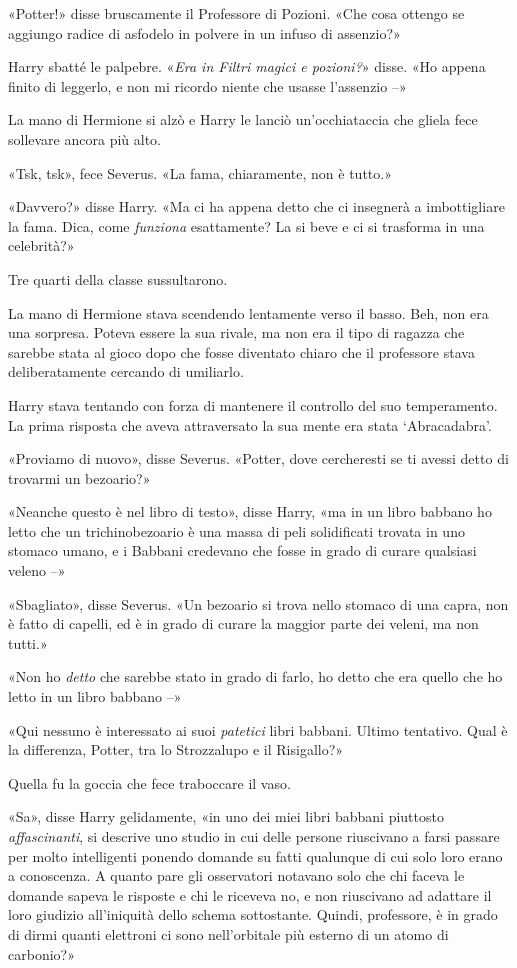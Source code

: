 «Potter!» disse bruscamente il Professore di Pozioni. «Che cosa ottengo se aggiungo radice di asfodelo in polvere in un infuso di assenzio?»

Harry sbatté le palpebre. «\textit{Era in Filtri magici e pozioni?}» disse. «Ho appena finito di leggerlo, e non mi ricordo niente che usasse l’assenzio –»

La mano di Hermione si alzò e Harry le lanciò un’occhiataccia che gliela fece sollevare ancora più alto.

«Tsk, tsk», fece Severus. «La fama, chiaramente, non è tutto.»

«Davvero?» disse Harry. «Ma ci ha appena detto che ci insegnerà a imbottigliare la fama. Dica, come \textit{funziona} esattamente? La si beve e ci si trasforma in una celebrità?»

Tre quarti della classe sussultarono.

La mano di Hermione stava scendendo lentamente verso il basso. Beh, non era una sorpresa. Poteva essere la sua rivale, ma non era il tipo di ragazza che sarebbe stata al gioco dopo che fosse diventato chiaro che il professore stava deliberatamente cercando di umiliarlo.

Harry stava tentando con forza di mantenere il controllo del suo temperamento. La prima risposta che aveva attraversato la sua mente era stata ‘Abracadabra’.

«Proviamo di nuovo», disse Severus. «Potter, dove cercheresti se ti avessi detto di trovarmi un bezoario?»

«Neanche questo è nel libro di testo», disse Harry, «ma in un libro babbano ho letto che un trichinobezoario è una massa di peli solidificati trovata in uno stomaco umano, e i Babbani credevano che fosse in grado di curare qualsiasi veleno –»

«Sbagliato», disse Severus. «Un bezoario si trova nello stomaco di una capra, non è fatto di capelli, ed è in grado di curare la maggior parte dei veleni, ma non tutti.»

«Non ho \textit{detto} che sarebbe stato in grado di farlo, ho detto che era quello che ho letto in un libro babbano –»

«Qui nessuno è interessato ai suoi \textit{patetici} libri babbani. Ultimo tentativo. Qual è la differenza, Potter, tra lo Strozzalupo e il Risigallo?»

Quella fu la goccia che fece traboccare il vaso.

«Sa», disse Harry gelidamente, «in uno dei miei libri babbani piuttosto \textit{affascinanti}, si descrive uno studio in cui delle persone riuscivano a farsi passare per molto intelligenti ponendo domande su fatti qualunque di cui solo loro erano a conoscenza. A quanto pare gli osservatori notavano solo che chi faceva le domande sapeva le risposte e chi le riceveva no, e non riuscivano ad adattare il loro giudizio all’iniquità dello schema sottostante. Quindi, professore, è in grado di dirmi quanti elettroni ci sono nell’orbitale più esterno di un atomo di carbonio?»

